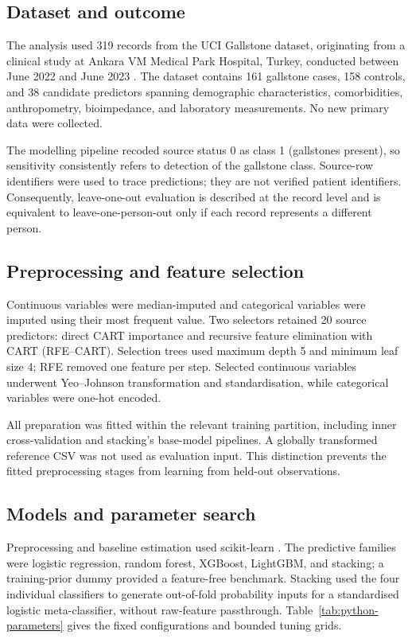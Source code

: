 \subsection{Dataset and outcome}
The analysis used 319 records from the UCI Gallstone dataset, originating from a clinical study at Ankara VM Medical Park Hospital, Turkey, conducted between June 2022 and June 2023 \parencite{esen2024early,uci2025gallstone}. The dataset contains 161 gallstone cases, 158 controls, and 38 candidate predictors spanning demographic characteristics, comorbidities, anthropometry, bioimpedance, and laboratory measurements. No new primary data were collected.

The modelling pipeline recoded source status 0 as class 1 (gallstones present), so sensitivity consistently refers to detection of the gallstone class. Source-row identifiers were used to trace predictions; they are not verified patient identifiers. Consequently, leave-one-out evaluation is described at the record level and is equivalent to leave-one-person-out only if each record represents a different person.

\subsection{Preprocessing and feature selection}
Continuous variables were median-imputed and categorical variables were imputed using their most frequent value. Two selectors retained 20 source predictors: direct CART importance and recursive feature elimination with CART (RFE--CART). Selection trees used maximum depth 5 and minimum leaf size 4; RFE removed one feature per step. Selected continuous variables underwent Yeo--Johnson transformation \parencite{yeo2000new} and standardisation, while categorical variables were one-hot encoded.

All preparation was fitted within the relevant training partition, including inner cross-validation and stacking's base-model pipelines. A globally transformed reference CSV was not used as evaluation input. This distinction prevents the fitted preprocessing stages from learning from held-out observations.

\subsection{Models and parameter search}
Preprocessing and baseline estimation used scikit-learn \parencite{pedregosa2011scikit}. The predictive families were logistic regression, random forest, XGBoost, LightGBM, and stacking; a training-prior dummy provided a feature-free benchmark. Stacking used the four individual classifiers to generate out-of-fold probability inputs for a standardised logistic meta-classifier, without raw-feature passthrough. Table~\ref{tab:python-parameters} gives the fixed configurations and bounded tuning grids.


